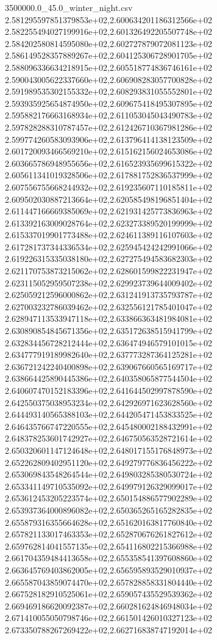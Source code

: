 \begin{filecontents*}{3500000.0_45.0_winter_night.csv}
2.581295597851379853e+02,2.600634201186312566e+02
2.582255494027199916e+02,2.601326492205507748e+02
2.584202580814595080e+02,2.602727879072081123e+02
2.586149528357889267e+02,2.604125306728901705e+02
2.588096336634218915e+02,2.605518774836746161e+02
2.590043005622337660e+02,2.606908283057700828e+02
2.591989535302155332e+02,2.608293831055552801e+02
2.593935925654874950e+02,2.609675418495307895e+02
2.595882176663168934e+02,2.611053045043490783e+02
2.597828288310787457e+02,2.612426710367981286e+02
2.599774260583093906e+02,2.613796414138123509e+02
2.601720093466569210e+02,2.615162156024653086e+02
2.603665786948955656e+02,2.616523935699615322e+02
2.605611341019328506e+02,2.617881752836537999e+02
2.607556755668244932e+02,2.619235607110185811e+02
2.609502030887213664e+02,2.620585498196851404e+02
2.611447166669385069e+02,2.621931425773836963e+02
2.613392163009028764e+02,2.623273389520199999e+02
2.615337019901773488e+02,2.624611389116107603e+02
2.617281737344336534e+02,2.625945424242991066e+02
2.619226315335038180e+02,2.627275494583682303e+02
2.621170753873215062e+02,2.628601599822231947e+02
2.623115052959507238e+02,2.629923739644009402e+02
2.625059212596000862e+02,2.631241913735793787e+02
2.627003232786039462e+02,2.632556121785401047e+02
2.628947113533947118e+02,2.633866363481984081e+02
2.630890854845671356e+02,2.635172638515941799e+02
2.632834456728212444e+02,2.636474946579101015e+02
2.634777919189982640e+02,2.637773287364125281e+02
2.636721242240400898e+02,2.639067660565169717e+02
2.638664425890445386e+02,2.640358065877544504e+02
2.640607470152183396e+02,2.641644502997878590e+02
2.642550375038953234e+02,2.642926971623628560e+02
2.644493140565388103e+02,2.644205471453833525e+02
2.646435766747220555e+02,2.645480002188432991e+02
2.648378253601742927e+02,2.646750563528721614e+02
2.650320601147124648e+02,2.648017155176848973e+02
2.652262809402951120e+02,2.649279776836456222e+02
2.653069843548264544e+02,2.649803285380530724e+02
2.653341149710535092e+02,2.649979126329099017e+02
2.653612453205223574e+02,2.650154886577902289e+02
2.653937364000896082e+02,2.650365265165282835e+02
2.655879316355664628e+02,2.651620163817760840e+02
2.657821133017463353e+02,2.652870676261827612e+02
2.659762814041557135e+02,2.654116802215366988e+02
2.661704359484413658e+02,2.655358541397608860e+02
2.663645769403862005e+02,2.656595893529010937e+02
2.665587043859074470e+02,2.657828858331804440e+02
2.667528182910525061e+02,2.659057435529539362e+02
2.669469186620092387e+02,2.660281624846948034e+02
2.671410055050798746e+02,2.661501426010327123e+02
2.673350788267269422e+02,2.662716838747192014e+02

\end{filecontents*}
